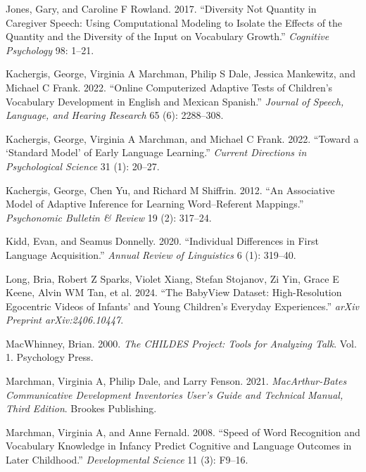\documentclass[
  11pt,
]{article}
\newlength{\cslhangindent}
\newenvironment{CSLReferences}[2] %
 {\begin{list}{}{%
  \setlength{\itemindent}{0pt}
  \setlength{\leftmargin}{0pt}
  \setlength{\parsep}{0pt}
  \ifodd #1
   \setlength{\leftmargin}{\cslhangindent}
   \setlength{\itemindent}{-1\cslhangindent}
  \fi
  \setlength{\itemsep}{#2\baselineskip}}}
 {\end{list}}
\begin{document}
\begin{CSLReferences}{1}{0}
Jones, Gary, and Caroline F Rowland. 2017. {``Diversity Not Quantity in
Caregiver Speech: Using Computational Modeling to Isolate the Effects of
the Quantity and the Diversity of the Input on Vocabulary Growth.''}
\emph{Cognitive Psychology} 98: 1--21.

Kachergis, George, Virginia A Marchman, Philip S Dale, Jessica
Mankewitz, and Michael C Frank. 2022. {``Online Computerized Adaptive
Tests of Children's Vocabulary Development in English and Mexican
Spanish.''} \emph{Journal of Speech, Language, and Hearing Research} 65
(6): 2288--308.

Kachergis, George, Virginia A Marchman, and Michael C Frank. 2022.
{``Toward a {`Standard Model'} of Early Language Learning.''}
\emph{Current Directions in Psychological Science} 31 (1): 20--27.

Kachergis, George, Chen Yu, and Richard M Shiffrin. 2012. {``An
Associative Model of Adaptive Inference for Learning Word--Referent
Mappings.''} \emph{Psychonomic Bulletin \& Review} 19 (2): 317--24.

Kidd, Evan, and Seamus Donnelly. 2020. {``Individual Differences in
First Language Acquisition.''} \emph{Annual Review of Linguistics} 6
(1): 319--40.

Long, Bria, Robert Z Sparks, Violet Xiang, Stefan Stojanov, Zi Yin,
Grace E Keene, Alvin WM Tan, et al. 2024. {``The BabyView Dataset:
High-Resolution Egocentric Videos of Infants' and Young Children's
Everyday Experiences.''} \emph{arXiv Preprint arXiv:2406.10447}.

MacWhinney, Brian. 2000. \emph{The {CHILDES} Project: Tools for
Analyzing Talk}. Vol. 1. Psychology Press.

Marchman, Virginia A, Philip Dale, and Larry Fenson. 2021.
\emph{MacArthur-Bates Communicative Development Inventories User's Guide
and Technical Manual, Third Edition}. Brookes Publishing.

Marchman, Virginia A, and Anne Fernald. 2008. {``Speed of Word
Recognition and Vocabulary Knowledge in Infancy Predict Cognitive and
Language Outcomes in Later Childhood.''} \emph{Developmental Science} 11
(3): F9--16.


\end{CSLReferences}
\end{document}
